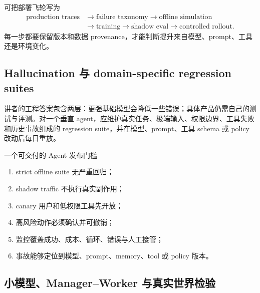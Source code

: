 \documentclass[a4paper]{article}
\begin{document}

可把部署飞轮写为
\[
\begin{aligned}
\text{production traces}&\rightarrow\text{failure taxonomy}
\rightarrow\text{offline simulation}\\
&\rightarrow\text{training}\rightarrow\text{shadow eval}
\rightarrow\text{controlled rollout}.
\end{aligned}
\]
每一步都要保留版本和数据 provenance，才能判断提升来自模型、prompt、工具还是环境变化。

\subsection{Hallucination 与 domain-specific regression suites}

讲者的工程答案包含两层：更强基础模型会降低一些错误；具体产品仍需自己的测试与评测。对一个垂直 agent，应维护真实任务、极端输入、权限边界、工具失败和历史事故组成的 regression suite，并在模型、prompt、工具 schema 或 policy 改动后每日重放。


\begin{importantbox}{一个可交付的 Agent 发布门槛}
\begin{enumerate}
  \item strict offline suite 无严重回归；
  \item shadow traffic 不执行真实副作用；
  \item canary 用户和低权限工具先开放；
  \item 高风险动作必须确认并可撤销；
  \item 监控覆盖成功、成本、循环、错误与人工接管；
  \item 事故能够定位到模型、prompt、memory、tool 或 policy 版本。
\end{enumerate}
\end{importantbox}

\subsection{小模型、Manager--Worker 与真实世界检验}
\end{document}
